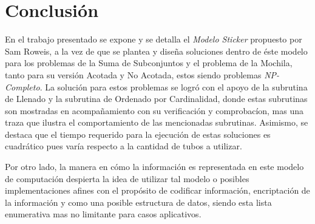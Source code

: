 \documentclass[12pt, letterpaper, twoside]{article}
\begin{document}
    \section{Conclusión}
    En el trabajo presentado se expone y se detalla el \emph{Modelo Sticker}\autocite{sticker_model} propuesto por Sam Roweis, a la vez de que se plantea y diseña soluciones dentro de éste modelo para los problemas de la Suma de Subconjuntos y el problema de la Mochila, tanto para su versión Acotada y No Acotada, estos siendo problemas \emph{NP-Completo}. La solución para estos problemas se logró con el apoyo de la subrutina de Llenado y la subrutina de Ordenado por Cardinalidad, donde estas subrutinas son mostradas en acompañamiento con su verificación y comprobacíon, mas una traza que ilustra el comportamiento de las mencionadas subrutinas. Asimismo, se destaca que el tiempo requerido para la ejecución de estas soluciones es cuadrático pues varía respecto a la cantidad de tubos a utilizar. 


    Por otro lado, la manera en cómo la información es representada en este modelo de computación despierta la idea de utilizar tal modelo o posibles implementaciones afines con el propósito de codificar información, encriptación de la información y como una posible estructura de datos, siendo esta lista enumerativa mas no limitante para casos aplicativos.

    \newpage
    \printbibliography
\end{document}
